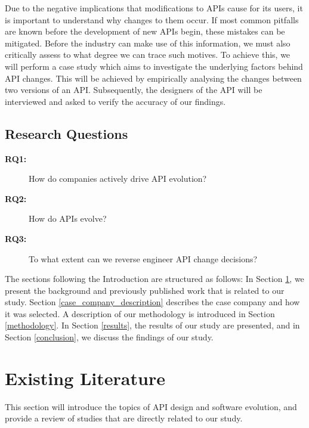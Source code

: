 \documentclass{sig-alternate}
\begin{document}
Due to the negative implications that modifications to APIs cause for its users, it is important to understand why changes to them occur. If most common pitfalls are known before the development of new APIs begin, these mistakes can be mitigated. Before the industry can make use of this information, we must also critically assess to what degree we can trace such motives. To achieve this, we will perform a case study which aims to investigate the underlying factors behind API changes. This will be achieved by empirically analysing the changes between two versions of an API. Subsequently, the designers of the API will be interviewed and asked to verify the accuracy of our findings. 

\subsection{Research Questions} \label{rqs}
\begin{description}
\item[\textbf{RQ1:}] How do companies actively drive API evolution?
\item[\textbf{RQ2:}] How do APIs evolve?
\item[\textbf{RQ3:}] To what extent can we reverse engineer API change decisions?


\end{description}

The sections following the Introduction are structured as follows: In Section \ref{existing_literature}, we present the background and previously published work that is related to our study. Section \ref{case_company_description} describes the case company and how it was selected. A description of our methodology is introduced in Section \ref{methodology}. In Section \ref{results}, the results of our study are presented, and in Section \ref{conclusion}, we discuss the findings of our study.

\section{Existing Literature} \label{existing_literature}
This section will introduce the topics of API design and software evolution, and provide a review of studies that are directly related to our study. 
\end{document}
